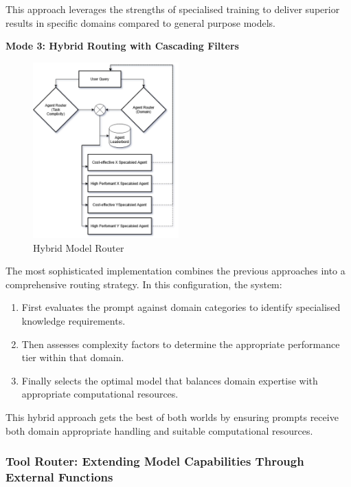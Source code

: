 This approach leverages the strengths of specialised training to deliver superior results in specific domains compared to general purpose models.

\textbf{Mode 3: Hybrid Routing with Cascading Filters}

\begin{figure}[H]
    \centering
    \includegraphics[width=0.5\textwidth]{figures/hybrid-agent-router.drawio.png}
    \caption{Hybrid Model Router}
    \label{fig:hybrid_model_router}
\end{figure}

The most sophisticated implementation combines the previous approaches into a comprehensive routing strategy. In this configuration, the system:

\begin{enumerate}
    \item First evaluates the prompt against domain categories to identify specialised knowledge requirements.
    \item Then assesses complexity factors to determine the appropriate performance tier within that domain.
    \item Finally selects the optimal model that balances domain expertise with appropriate computational resources.
\end{enumerate}

This hybrid approach gets the best of both worlds by ensuring prompts receive both domain appropriate handling and suitable computational resources.

\subsubsection{Tool Router: Extending Model Capabilities Through External Functions}

